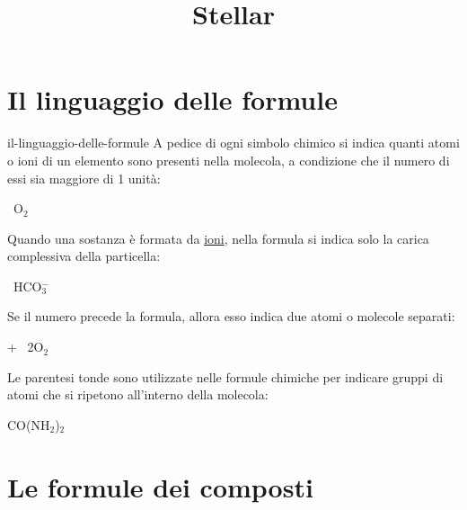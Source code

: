 \documentclass[preview]{standalone}
\begin{document}
\title{Stellar}
\genpage

\section{Il linguaggio delle formule}

\begin{snippet}{il-linguaggio-delle-formule}
    A pedice di ogni simbolo chimico si indica quanti atomi o ioni di un elemento sono presenti
    nella molecola, a condizione che il numero di essi sia maggiore di 1 unità:
    \vspace{0.4cm}
    \begin{center}
        {\centering {} \textrightarrow\ O$_2$}
    \end{center}
    \vspace{0.4cm}
    Quando una sostanza è formata da \underline{ioni}, nella formula si indica solo la
    carica complessiva della particella:
    \vspace{0.4cm}
    \begin{center}
        {\centering
        \textrightarrow\ HCO$^-_3$
        }
    \end{center}
    \vspace{0.4cm}
    Se il numero precede la formula, allora esso indica due atomi o molecole separati:
    \vspace{0.4cm}
    \begin{center}
        {\centering {}
        } +\:
        {\centering {}
        }
        \textrightarrow\ 2O$_2$
    \end{center}
    \vspace{0.4cm}
    Le parentesi tonde sono utilizzate nelle formule chimiche per indicare gruppi di atomi
    che si ripetono all'interno della molecola:
    \vspace{0.4cm}
    \begin{center}
        {\centering CO(NH$_2$)$_2$
        }
    \end{center}
\end{snippet}

\section{Le formule dei composti}
\end{document}
